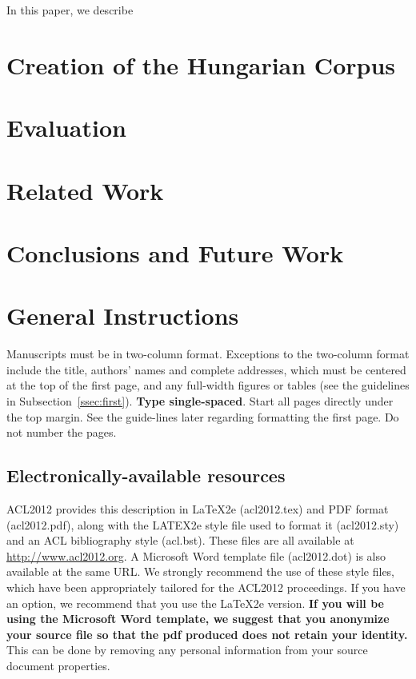 \documentclass[11pt]{article}
\begin{document}
In this paper, we describe %

\section{Creation of the Hungarian Corpus}


\section{Evaluation}


\section{Related Work}

\section{Conclusions and Future Work}

\section{General Instructions}

Manuscripts must be in two-column format. Exceptions to the two-column format include the title, 
authors' names and complete addresses, which must be centered at the top of the first page, 
and any full-width figures or tables (see the guidelines in Subsection~\ref{ssec:first}). {\bf Type single-spaced}. 
Start all pages directly under the top margin. See the guide-lines later regarding formatting the first page. Do not number the pages.

\subsection{Electronically-available resources}

ACL2012 provides this description in \LaTeX2e (acl2012.tex) and PDF format (acl2012.pdf), along with the LATEX2e style file used to format it (acl2012.sty) and an ACL bibliography style (acl.bst). These files are all available at \url{http://www.acl2012.org}.  A Microsoft Word template file (acl2012.dot) is also available at the same URL. We strongly recommend the use of these style files, which have been appropriately tailored for the ACL2012 proceedings. If you have an option, we recommend that you use the \LaTeX2e version. \textbf{If you will be using the Microsoft Word template, we suggest that you anonymize your source file so that the pdf produced does not retain your identity.} This can be done by removing any personal information from your source
document properties.
\end{document}
